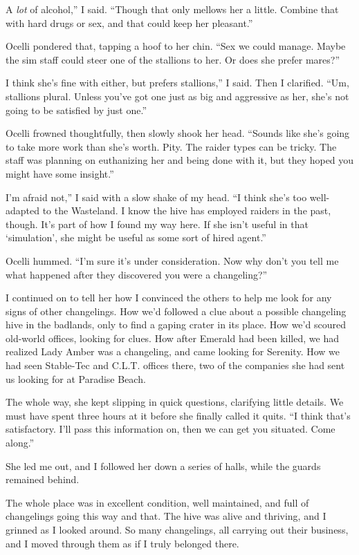 \leavevmode{}A \textit{lot} of alcohol,” I said. “Though that only mellows her a little. Combine that with hard drugs or sex, and that could keep her pleasant.”

Ocelli pondered that, tapping a hoof to her chin. “Sex we could manage. Maybe the sim staff could steer one of the stallions to her. Or does she prefer mares?”

\leavevmode{}I think she’s fine with either, but prefers stallions,” I said. Then I clarified. “Um, stallions plural. Unless you’ve got one just as big and aggressive as her, she’s not going to be satisfied by just one.”

Ocelli frowned thoughtfully, then slowly shook her head. “Sounds like she’s going to take more work than she’s worth. Pity. The raider types can be tricky. The staff was planning on euthanizing her and being done with it, but they hoped you might have some insight.”

\leavevmode{}I’m afraid not,” I said with a slow shake of my head. “I think she’s too well-adapted to the Wasteland. I know the hive has employed raiders in the past, though. It’s part of how I found my way here. If she isn’t useful in that ‘simulation’, she might be useful as some sort of hired agent.”

Ocelli hummed. “I’m sure it’s under consideration. Now why don’t you tell me what happened after they discovered you were a changeling?”

I continued on to tell her how I convinced the others to help me look for any signs of other changelings. How we’d followed a clue about a possible changeling hive in the badlands, only to find a gaping crater in its place. How we’d scoured old-world offices, looking for clues. How after Emerald had been killed, we had realized Lady Amber was a changeling, and came looking for Serenity. How we had seen Stable-Tec and C.L.T. offices there, two of the companies she had sent us looking for at Paradise Beach.

The whole way, she kept slipping in quick questions, clarifying little details. We must have spent three hours at it before she finally called it quits. “I think that’s satisfactory. I’ll pass this information on, then we can get you situated. Come along.”

She led me out, and I followed her down a series of halls, while the guards remained behind.

The whole place was in excellent condition, well maintained, and full of changelings going this way and that. The hive was alive and thriving, and I grinned as I looked around. So many changelings, all carrying out their business, and I moved through them as if I truly belonged there.

